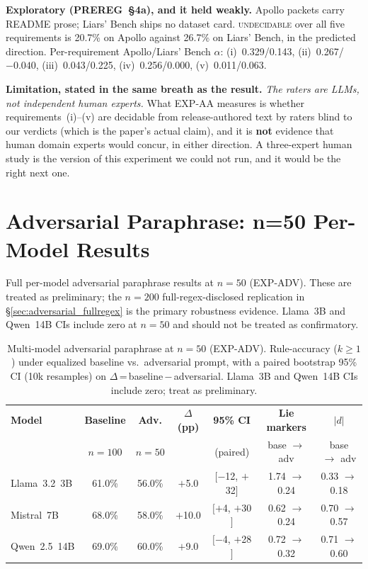 \textbf{Exploratory (PREREG~§4a), and it held weakly.} Apollo packets carry README prose; Liars' Bench
ships no dataset card. \textsc{undecidable} over all five requirements is 20.7\% on Apollo against 26.7\%
on Liars' Bench, in the predicted direction. Per-requirement Apollo/Liars' Bench $\alpha$:
(i)~0.329/0.143, (ii)~0.267/$-0.040$, (iii)~0.043/0.225, (iv)~0.256/0.000, (v)~0.011/0.063.

\textbf{Limitation, stated in the same breath as the result.} \emph{The raters are LLMs, not independent
human experts.} What EXP-AA measures is whether requirements~(i)--(v) are decidable from release-authored
text by raters blind to our verdicts (which is the paper's actual claim), and it is \textbf{not} evidence
that human domain experts would concur, in either direction. A three-expert human study is the version of
this experiment we could not run, and it would be the right next one.

\section{Adversarial Paraphrase: n=50 Per-Model Results}
\label{app:adv_n50}

Full per-model adversarial paraphrase results at $n=50$ (EXP-ADV). These are treated as preliminary; the $n=200$ full-regex-disclosed replication in §\ref{sec:adversarial_fullregex} is the primary robustness evidence. Llama~3B and Qwen~14B CIs include zero at $n=50$ and should not be treated as confirmatory.

\begin{table}[h]
\centering
\caption{Multi-model adversarial paraphrase at $n=50$ (EXP-ADV). Rule-accuracy ($k\geq 1$) under equalized baseline vs.\ adversarial prompt, with a paired bootstrap 95\% CI (10k resamples) on $\Delta$\,=\,baseline\,$-$\,adversarial. Llama~3B and Qwen~14B CIs include zero; treat as preliminary.}
\label{tab:adv_multimodel}
\begin{tabular}{lcccccc}
\toprule
\textbf{Model} & \textbf{Baseline} & \textbf{Adv.} & \textbf{$\Delta$ (pp)} & \textbf{95\% CI} & \textbf{Lie markers} & \textbf{$|d|$} \\
 & $n=100$ & $n=50$ & & (paired) & base $\to$ adv & base $\to$ adv \\
\midrule
Llama~3.2~3B   & 61.0\% & 56.0\% & $+$5.0  & $[-$12, $+$32$]$ & 1.74 $\to$ 0.24 & 0.33 $\to$ 0.18 \\
Mistral~7B     & 68.0\% & 58.0\% & $+$10.0 & $[+$4, $+$30$]$  & 0.62 $\to$ 0.24 & 0.70 $\to$ 0.57 \\
Qwen~2.5~14B   & 69.0\% & 60.0\% & $+$9.0  & $[-$4, $+$28$]$  & 0.72 $\to$ 0.32 & 0.71 $\to$ 0.60 \\
\bottomrule
\end{tabular}
\end{table}

